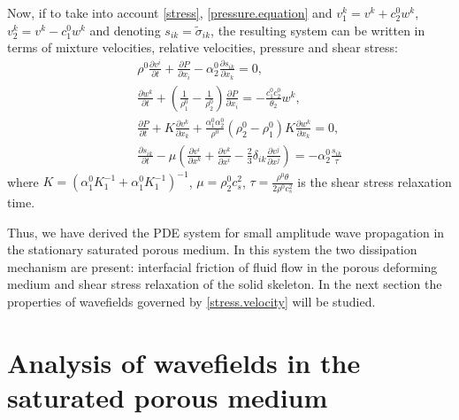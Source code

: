 \documentclass[3p,times]{elsarticle}
\begin{document}
Now, if to take into account \eqref{stress}, \eqref{pressure.equation} and $v_1^k=v^k+c_2^0w^k$, 
$v_2^k=v^k-c_1^0w^k$ and denoting $s_{ik}=\tilde \sigma_{ik}$, the resulting system can be written in terms of mixture velocities, relative velocities, pressure and shear stress:
\begin{eqnarray} \label{stress.velocity}
&& \rho^0 \frac{\partial v^i}{\partial t}+\frac{\partial P}{\partial x_i}-
\alpha^0_2 \frac{\partial s_{ik}}{\partial x_k} = 0, \nonumber \\
&& \frac{\partial w^k}{\partial t}+ \left(\frac{1}{\rho_1^0} - \frac{1}{\rho_2^0}\right)\frac{\partial P}{\partial x_i}=
-\frac{c_1^0c_2^0}{\theta_2}w^k,  \\
&& \frac{\partial P}{\partial t} +K\frac{\partial v^k}{\partial x_k}+
\frac{\alpha_1^0\alpha_2^0}{\rho^0}\left(\rho^0_2-\rho^0_1 \right)
K\frac{\partial w^k}{\partial x_k} =0,  \nonumber \\
&&\frac{\partial s_{ik}}{\partial t} - 
\mu\left(\frac{\partial v^i}{\partial x^k} +\frac{\partial v^k}{\partial x^i}-
\frac{2}{3}\delta_{ik}\frac{\partial v^j}{\partial x^j} \right) = 
- \alpha_2^0 \frac{s_{ik}}{\tau} \nonumber 
\end{eqnarray}
where $K=\left(\alpha_1^0 K_1^{-1}+\alpha_1^0 K_1^{-1}\right)^{-1}$, $\mu=\rho_2^0 c_s^2$, $\tau=\frac{\rho^0 \theta}{2 \rho^0 c_s^2}$ is the shear stress relaxation time.

Thus, we have derived the PDE system for small amplitude wave propagation in the stationary saturated porous medium. In this system the two dissipation mechanism are present: interfacial friction of fluid flow in the porous deforming medium and shear stress relaxation of the solid skeleton. In the next section the properties of wavefields governed by \eqref{stress.velocity} will be studied.



\section{Analysis of wavefields in the saturated porous medium}
\end{document}
